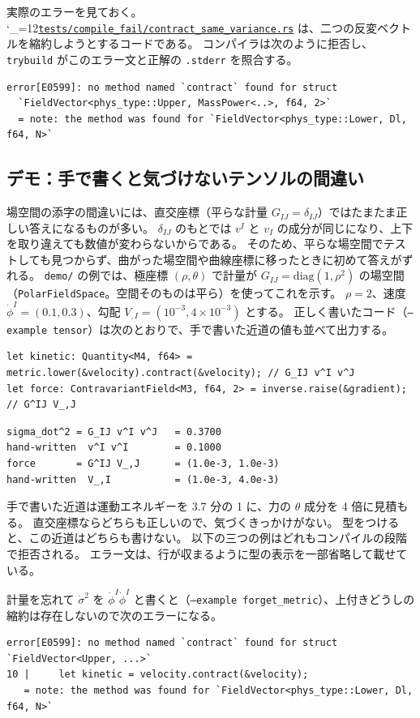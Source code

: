 \documentclass[a4paper,11pt]{ltjsarticle}
\newcommand{\code}[1]{\texttt{#1}}
\newcommand{\repourl}{https://github.com/inuverse44/phys-type-dev}
\newcommand{\reporev}{b1fea87}
\newcommand{\repoas}{\begingroup\catcode`\_=12\relax\repoasaux}
\newcommand{\repoasaux}[2]{\href{\repourl/blob/\reporev/#1}{\texttt{#2}}\endgroup}
\begin{document}
実際のエラーを見ておく。
\repoas{crates/phys-type/tests/compile_fail/contract_same_variance.rs}{tests/compile_fail/contract_same_variance.rs} は、二つの反変ベクトルを縮約しようとするコードである。
コンパイラは次のように拒否し、\code{trybuild} がこのエラー文と正解の \code{.stderr} を照合する。
\begin{lstlisting}
error[E0599]: no method named `contract` found for struct
  `FieldVector<phys_type::Upper, MassPower<..>, f64, 2>`
  = note: the method was found for `FieldVector<phys_type::Lower, Dl, f64, N>`
\end{lstlisting}

\subsection{デモ：手で書くと気づけないテンソルの間違い}
\label{sec:tensor-demo}

場空間の添字の間違いには、直交座標（平らな計量 $G_{IJ}=\delta_{IJ}$）ではたまたま正しい答えになるものが多い。
$\delta_{IJ}$ のもとでは $v^I$ と $v_I$ の成分が同じになり、上下を取り違えても数値が変わらないからである。
そのため、平らな場空間でテストしても見つからず、曲がった場空間や曲線座標に移ったときに初めて答えがずれる。
\code{demo/} の例では、極座標 $(\rho,\theta)$ で計量が $G_{IJ}=\mathrm{diag}(1,\rho^2)$ の場空間（\code{PolarFieldSpace}。空間そのものは平ら）を使ってこれを示す。
$\rho=2$、速度 $\dot\phi^I=(0.1,0.3)$、勾配 $V_{,I}=(10^{-3},4\times10^{-3})$ とする。
正しく書いたコード（\code{--example tensor}）は次のとおりで、手で書いた近道の値も並べて出力する。
\begin{lstlisting}
let kinetic: Quantity<M4, f64> = metric.lower(&velocity).contract(&velocity); // G_IJ v^I v^J
let force: ContravariantField<M3, f64, 2> = inverse.raise(&gradient);         // G^IJ V_,J
\end{lstlisting}
\begin{lstlisting}[language={}]
sigma_dot^2 = G_IJ v^I v^J   = 0.3700
hand-written  v^I v^I        = 0.1000
force       = G^IJ V_,J      = (1.0e-3, 1.0e-3)
hand-written  V_,I           = (1.0e-3, 4.0e-3)
\end{lstlisting}
手で書いた近道は運動エネルギーを 3.7 分の 1 に、力の $\theta$ 成分を 4 倍に見積もる。
直交座標ならどちらも正しいので、気づくきっかけがない。
型をつけると、この近道はどちらも書けない。
以下の三つの例はどれもコンパイルの段階で拒否される。
エラー文は、行が収まるように型の表示を一部省略して載せている。

計量を忘れて $\dot\sigma^2$ を $\dot\phi^I\dot\phi^I$ と書くと（\code{--example forget\_metric}）、上付きどうしの縮約は存在しないので次のエラーになる。
\begin{lstlisting}[language={}]
error[E0599]: no method named `contract` found for struct `FieldVector<Upper, ...>`
10 |     let kinetic = velocity.contract(&velocity);
   = note: the method was found for `FieldVector<phys_type::Lower, Dl, f64, N>`
\end{lstlisting}
\end{document}
